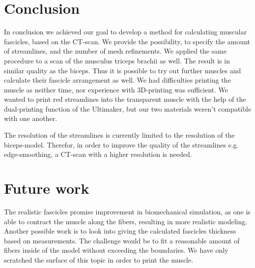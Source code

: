 \documentclass[preprint,journal]{vgtc}       %
\begin{document}
\section{Conclusion}
In conclusion we achieved our goal to develop a method for calculating muscular fascicles, based on the CT-scan.
We provide the possibility, to specify the amount of streamlines, and the number of mesh refinements. 
We applied the same procedure to a scan of the musculus triceps brachii as well. 
The result is in similar quality as the biceps.
Thus it is possible to try out further muscles and calculate their fascicle arrangement as well.
We had difficulties printing the muscle as neither time, nor experience with 3D-printing was sufficient. 
We wanted to print red streamlines into the transparent muscle with the help of the dual-printing function of the Ultimaker, but our two materials weren't compatible with one another. 

The resolution of the streamlines is currently limited to the resolution of the biceps-model. 
Therefor, in order to improve the quality of the streamlines e.g. edge-smoothing, a CT-scan with a higher resolution is needed. 

\section{Future work}
The realistic fascicles promise improvement in biomechanical simulation, as one is able to contract the muscle along the fibers, resulting in more realistic modeling. 
Another possible work is to look into giving the calculated fascicles thickness based on measurements. 
The challenge would be to fit a reasonable amount of fibers inside of the model without exceeding the boundaries.
We have only scratched the surface of this topic in order to print the muscle.



\end{document}
